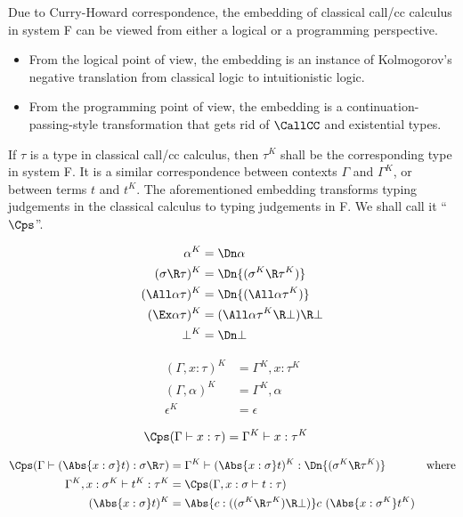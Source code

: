 \documentclass{amsart}
\begin{document}
Due to Curry-Howard correspondence, the embedding of classical
call/cc calculus in system F can be viewed from either a
logical or a programming perspective.
\begin{itemize}
\item From the logical point of view, the embedding is an
instance of Kolmogorov's negative translation from classical
logic to intuitionistic logic.
\item From the programming point of view, the embedding is a
continuation-passing-style transformation that gets rid of
$\CallCC$ and existential types.
\end{itemize}
If $\tau$ is a type in classical call/cc calculus, then $\tau^K$
shall be the corresponding type in system F. It is a similar
correspondence between contexts $\Gamma$ and $\Gamma^K$, or
between terms $t$ and $t^K$. The aforementioned embedding
transforms typing judgements in the classical calculus to typing
judgements in F. We shall call it ``$\Cps$''.

\begin{align*}
\alpha^K & =
  \Dn\alpha
  \\
(\sigma \R \tau)^K & =
  \Dn{(\sigma^K \R \tau^K)}
  \\
(\All\alpha\tau)^K & =
  \Dn{(\All\alpha\tau^K)}
  \\
(\Ex\alpha\tau)^K & =
  (\All\alpha \tau^K \R \bot) \R \bot
  \\
\bot^K & =
  \Dn\bot
\end{align*}

\begin{align*}
(\Gamma, x:\tau)^K & =
  \Gamma^K, x:\tau^K
  \\
(\Gamma, \alpha)^K & =
  \Gamma^K, \alpha
  \\
\epsilon^K & =
  \epsilon
\end{align*}

\begin{align*}
\Cps(\Gamma \vdash x : \tau) & =
  \Gamma^K \vdash x : \tau^K
\end{align*}

\begin{align*}
\Cps(\Gamma \vdash (\Abs{x:\sigma}t) : \sigma \R \tau) & =
  \Gamma^K \vdash (\Abs{x:\sigma}t)^K : \Dn{(\sigma^K \R \tau^K)} &
  \mbox{where}
  \\
\Gamma^K,x:\sigma^K \vdash t^K : \tau^K & =
  \Cps(\Gamma,x:\sigma \vdash t : \tau)
  \\
(\Abs{x:\sigma}t)^K & =
  \Abs{c : ((\sigma^K \R \tau^K) \R \bot)}c~(\Abs{x : \sigma^K} t^K)
\end{align*}
\end{document}
